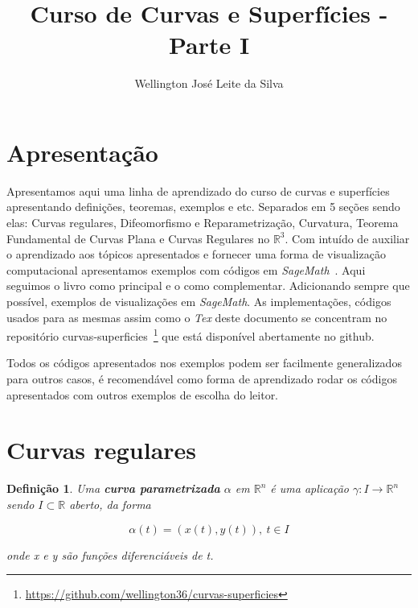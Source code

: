 \documentclass[12pt]{article}
\title{Curso de Curvas e Superfícies - Parte I}
\author{Wellington José Leite da Silva\inst{1}}
\date{}
\newtheorem{definition}{Definição}
\newcommand{\furl}[1]{\footnote{\url{#1}}}
\begin{document}
\maketitle






\section*{Apresentação}\label{s1}
Apresentamos aqui uma linha de aprendizado do curso de curvas e superfícies apresentando definições, teoremas, exemplos e etc. Separados em 5 seções sendo elas: Curvas regulares, Difeomorfismo e Reparametrização, Curvatura, Teorema Fundamental de Curvas Plana e Curvas Regulares no $\mathbb{R}^3$. Com intuído de auxiliar o aprendizado aos tópicos apresentados e fornecer uma forma de visualização computacional apresentamos exemplos com códigos em \textit{SageMath}~\cite{sagemath}. Aqui seguimos o livro \cite{bookmain} como principal e o \cite{manfredo} como complementar. Adicionando sempre que possível, exemplos de visualizações em \textit{SageMath}. As implementações, códigos usados para as mesmas assim como o \textit{Tex} deste documento se concentram no repositório curvas-superficies~\furl{https://github.com/wellington36/curvas-superficies} que está disponível abertamente no github.

Todos os códigos apresentados nos exemplos podem ser facilmente generalizados para outros casos, é recomendável como forma de aprendizado rodar os códigos apresentados com outros exemplos de escolha do leitor.

\section{Curvas regulares}\label{s2}

\begin{definition}
Uma \textbf{curva parametrizada} $\alpha$ em $\mathbb{R}^n$ é uma aplicação $\gamma: I \rightarrow \mathbb{R}^n$ sendo $I \subset \mathbb{R}$ aberto, da forma

$$\alpha(t) = (x(t), y(t)),\ t\in I$$

onde x e y são funções diferenciáveis de t.
\end{definition}
\end{document}
